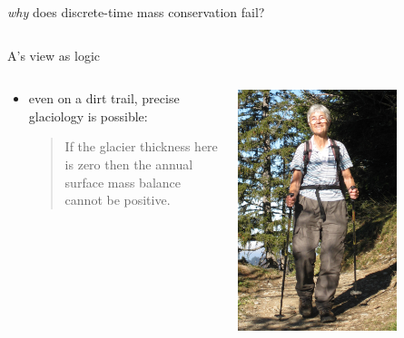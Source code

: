 \documentclass[10pt,hyperref,dvipsnames]{beamer}
\begin{document}
\begin{frame}{\emph{why} does discrete-time mass conservation fail?}
\begin{columns}
\begin{column}{0.3\textwidth}
\end{column}
\end{columns}
\end{frame}

\begin{frame}{A's view as logic}

\begin{columns}
\begin{column}{0.8\textwidth}
\begin{itemize}
\item even on a dirt trail, precise glaciology is possible:

\bigskip
\begin{quote}
If the glacier thickness here is zero then the annual surface mass balance cannot be positive.
\end{quote}
\end{itemize}
\end{column}
\begin{column}{0.2\textwidth}
\hfill \includegraphics[width=0.7\textwidth]{figs/Iken_front_crop.jpg} \hfill
\end{column}
\end{columns}


\end{frame}
\end{document}

